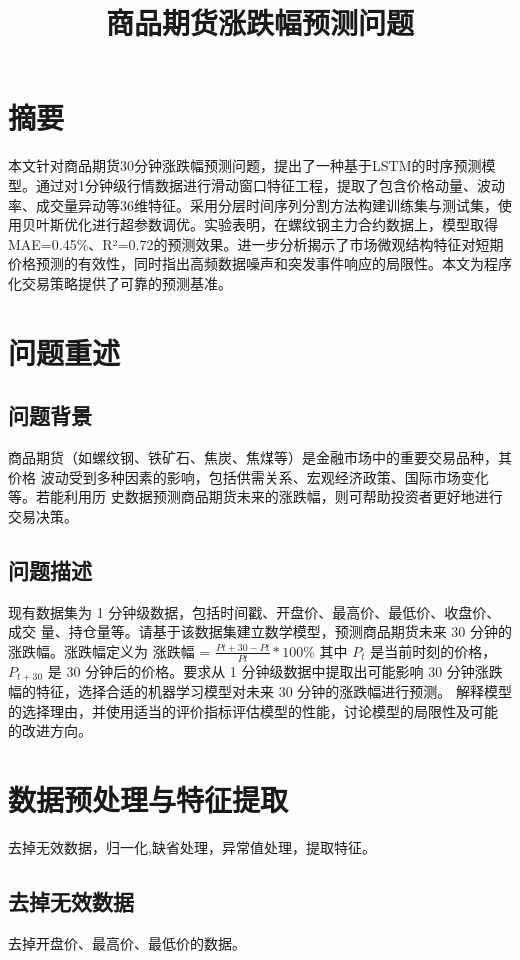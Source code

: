 \documentclass[a4paper,12pt]{ctexart}
\title{ 商品期货涨跌幅预测问题}
\date{}
\begin{document}
\maketitle
 

 
\section{摘要}
本文针对商品期货30分钟涨跌幅预测问题，提出了一种基于LSTM的时序预测模型。通过对1分钟级行情数据进行滑动窗口特征工程，提取了包含价格动量、波动率、成交量异动等36维特征。采用分层时间序列分割方法构建训练集与测试集，使用贝叶斯优化进行超参数调优。实验表明，在螺纹钢主力合约数据上，模型取得MAE=0.45\%、R²=0.72的预测效果。进一步分析揭示了市场微观结构特征对短期价格预测的有效性，同时指出高频数据噪声和突发事件响应的局限性。本文为程序化交易策略提供了可靠的预测基准。
 
\section{问题重述}
\subsection{问题背景}
商品期货（如螺纹钢、铁矿石、焦炭、焦煤等）是金融市场中的重要交易品种，其价格
波动受到多种因素的影响，包括供需关系、宏观经济政策、国际市场变化等。若能利用历
史数据预测商品期货未来的涨跌幅，则可帮助投资者更好地进行交易决策。




\subsection{问题描述}
现有数据集为 1 分钟级数据，包括时间戳、开盘价、最高价、最低价、收盘价、成交
量、持仓量等。请基于该数据集建立数学模型，预测商品期货未来 30 分钟的涨跌幅。涨跌幅定义为
涨跌幅 = ${ \frac{Pt+30 - Pt}{Pt} * 100\% }$
其中 $P_t$ 是当前时刻的价格，$P_{t+30}$ 是 30 分钟后的价格。要求从 1 分钟级数据中提取出可能影响 30 分钟涨跌幅的特征，选择合适的机器学习模型对未来 30 分钟的涨跌幅进行预测。
解释模型的选择理由，并使用适当的评价指标评估模型的性能，讨论模型的局限性及可能
的改进方向。
\section{数据预处理与特征提取}
去掉无效数据，归一化,缺省处理，异常值处理，提取特征。
\subsection{去掉无效数据}
去掉开盘价、最高价、最低价的数据。
\end{document}
